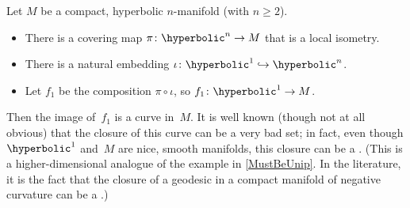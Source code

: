 \begin{minipage}{2.6in}
{{\begin{minipage}{2in}
%
%
%
%
%
%
%
%
%
%
\end{minipage}
 \vss}\hss}
 \raggedright
\begin{eg} \label{FractalInHyper3Mfld}
 Let $M$ be a  compact, hyperbolic $n$-manifold (with $n \ge 2$).
 \begin{itemize} \itemindent=0pt \leftskip=\parindent
\item There is a covering map $\pi \colon \hyperbolic^n \to M$ that is a local isometry.
\item There is a natural embedding $\iota \colon \hyperbolic^1 \hookrightarrow
\hyperbolic^n$.
\item Let $f_1$ be the composition $\pi \circ \iota$,
 \newline so $f_1 \colon \hyperbolic^1  \to M$.
 \end{itemize}
 \end{eg}
 \end{minipage}

\smallskip

\noindent Then the image of~$f_1$ is a curve in~$M$. It is well known (though not at all obvious) that the closure of this curve can be a very bad set; in fact, even though $\hyperbolic^1$ and~$M$ are nice, smooth manifolds, this closure can be a . (This is a higher-dimensional analogue of the example in \cref{MustBeUnip}. In the literature, it is the fact that the closure of a geodesic in a compact manifold of negative curvature can be a .)

